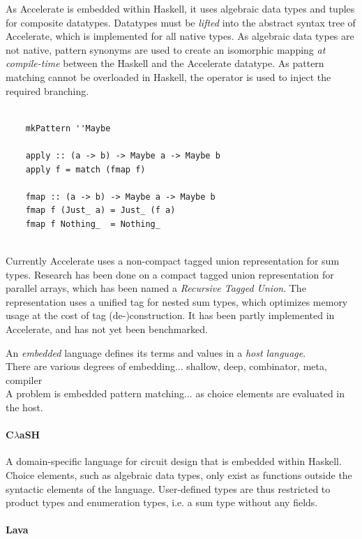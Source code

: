 \documentclass{article}
\newcommand{\type}[1]{\smash{\colorbox{codegray}{\texttt{#1}}}}
\begin{document}
As Accelerate is embedded within Haskell, it uses algebraic data types and tuples for composite datatypes.
Datatypes must be {\it lifted} into the abstract syntax tree of Accelerate, which is implemented for all native types.
As algebraic data types are not native, pattern synonyms are used to create an isomorphic mapping {\it at compile-time} between the Haskell and the Accelerate datatype.
As pattern matching cannot be overloaded in Haskell, the \type{match} operator is used to inject the required branching\cite{accelerate-pattern-matching}.

\begin{verbatim}
    
    mkPattern ''Maybe

    apply :: (a -> b) -> Maybe a -> Maybe b
    apply f = match (fmap f)

    fmap :: (a -> b) -> Maybe a -> Maybe b
    fmap f (Just_ a) = Just_ (f a)
    fmap f Nothing_  = Nothing_
    
\end{verbatim}

Currently Accelerate uses a non-compact tagged union representation for sum types.
Research has been done on a compact tagged union representation for parallel arrays, which has been named a {\it Recursive Tagged Union}\cite{accelerate-sum-types}.
The representation uses a unified tag for nested sum types, which optimizes memory usage at the cost of tag (de-)construction.  
It has been partly implemented in Accelerate, and has not yet been benchmarked.

An {\it embedded} language defines its terms and values in a {\it host language}.
\\
There are various degrees of embedding... shallow, deep, combinator, meta, compiler
\\
A problem is embedded pattern matching... as choice elements are evaluated in the host.

\paragraph{C$\lambda$aSH}

A domain-specific language for circuit design that is embedded within Haskell.
Choice elements, such as algebraic data types, only exist as functions outside the syntactic elements of the language.
User-defined types are thus restricted to product types and enumeration types, i.e. a sum type without any fields. \cite{clash}

\paragraph{Lava}
\end{document}
